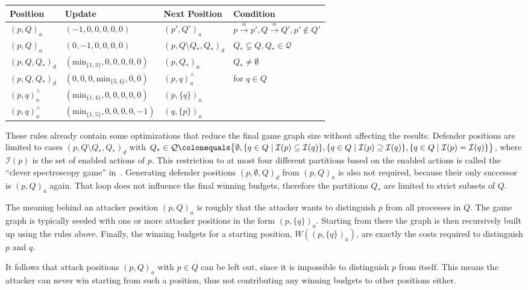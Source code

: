 \begin{table}[h!]
\centering

\begin{tabular}{@{}l@{\hskip 8pt}l@{\hskip 5pt}l l@{}}
    \toprule
    Position &Update &Next Position &Condition \\
    \midrule
    ${(p, Q)}_a$ &$(-1, 0, 0, 0, 0, 0)$ &${(p', Q')}_a$
        &$p \xrightarrow{\alpha} p', Q \xrightarrow{\alpha} Q', p' \notin Q'$ \\
    ${(p, Q)}_a$ &$(0, -1, 0, 0, 0, 0)$ &${(p, Q \setminus Q_*, Q_*)}_d$
        &$Q_* \subsetneq Q, Q_* \in \mathcal{Q}$ \\
    ${(p, Q, Q_*)}_d$ &$(\mathrm{min}_{\{1, 3\}}, 0, 0, 0, 0, 0)$ &${(p, Q_*)}_a$
        &$Q_* \neq \emptyset$ \\
    ${(p, Q, Q_*)}_d$ &$(0, 0, 0, \mathrm{min}_{\{3, 4\}}, 0, 0)$
        &${(p, q)}_a^{\scriptscriptstyle\land}$
        &for $q \in Q$ \\
    ${(p, q)}_a^{\scriptscriptstyle\land}$
        &$(\mathrm{min}_{\{1, 4\}}, 0, 0, 0, 0, 0)$
        &${(p, \{q\})}_a$ \\
    ${(p, q)}_a^{\scriptscriptstyle\land}$
        &$(\mathrm{min}_{\{1, 5\}}, 0, 0, 0, 0, -1)$
        &${(q, \{p\})}_a$ \\
    \bottomrule
\end{tabular}
\end{table}

These rules already contain some optimizations that reduce the final game graph
size without affecting the results.
Defender positions are limited to cases
${(p, Q \setminus Q_*, Q_*)}_d$ with
$Q_* \in \mathcal{Q} \colonequals
\big\{\emptyset,
    \{q \in Q \mid \mathcal{I}(p) \subseteq \mathcal{I}(q)\},
    \{q \in Q \mid {\mathcal{I}(p) \supseteq \mathcal{I}(q)}\},
    \{q \in Q \mid \mathcal{I}(p) =         \mathcal{I}(q)\}
\big\}$,
where $\mathcal{I}(p)$ is the set of enabled actions of $p$.
This restriction to at most four different partitions
based on the enabled actions is called the
\enquote{clever spectroscopy game} in~\cite{bisping2023process}.
Generating defender positions ${(p, \emptyset, Q)}_d$ from ${(p, Q)}_a$
is also not required,
because their only successor is ${(p, Q)}_a$ again.
That loop does not influence the final winning budgets,
therefore the partitions $Q_*$ are limited to strict subsets of $Q$.

The meaning behind an attacker position ${(p, Q)}_a$ is roughly
that the attacker wants to distinguish $p$ from all processes in $Q$.
The game graph is typically seeded with one or more attacker positions
in the form ${(p, \{q\})}_a$.
Starting from there the graph is then recursively built up
using the rules above.
Finally, the winning budgets for a starting position,
$W({(p, \{q\})}_a)$,
are exactly the costs required to distinguish $p$ and $q$.

It follows that attack positions ${(p, Q)}_a$ with $p \in Q$ can be left out,
since it is impossible to distinguish $p$ from itself.
This means the attacker can never win starting from such a position,
thus not contributing any winning budgets to other positions either.
